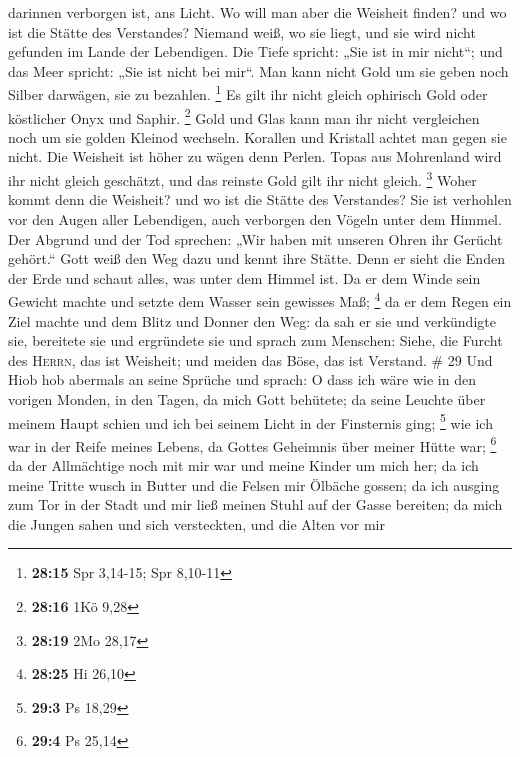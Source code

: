 darinnen verborgen ist, ans Licht.  Wo will man aber die
Weisheit finden? und wo ist die Stätte des Verstandes? 
Niemand weiß, wo sie liegt, und sie wird nicht gefunden im Lande der
Lebendigen.  Die Tiefe spricht: „Sie ist in mir nicht``;
und das Meer spricht: „Sie ist nicht bei mir``.  Man kann
nicht Gold um sie geben noch Silber darwägen, sie zu bezahlen.
\footnote{\textbf{28:15} Spr 3,14-15; Spr 8,10-11}  Es
gilt ihr nicht gleich ophirisch Gold oder köstlicher Onyx und Saphir.
\footnote{\textbf{28:16} 1Kö 9,28}  Gold und Glas kann
man ihr nicht vergleichen noch um sie golden Kleinod wechseln.
 Korallen und Kristall achtet man gegen sie nicht. Die
Weisheit ist höher zu wägen denn Perlen.  Topas aus
Mohrenland wird ihr nicht gleich geschätzt, und das reinste Gold gilt
ihr nicht gleich. \footnote{\textbf{28:19} 2Mo 28,17} 
Woher kommt denn die Weisheit? und wo ist die Stätte des Verstandes?
 Sie ist verhohlen vor den Augen aller Lebendigen, auch
verborgen den Vögeln unter dem Himmel.  Der Abgrund und
der Tod sprechen: „Wir haben mit unseren Ohren ihr Gerücht gehört.``
 Gott weiß den Weg dazu und kennt ihre Stätte.
 Denn er sieht die Enden der Erde und schaut alles, was
unter dem Himmel ist.  Da er dem Winde sein Gewicht
machte und setzte dem Wasser sein gewisses Maß; \footnote{\textbf{28:25}
  Hi 26,10}  da er dem Regen ein Ziel machte und dem
Blitz und Donner den Weg:  da sah er sie und verkündigte
sie, bereitete sie und ergründete sie  und sprach zum
Menschen: Siehe, die Furcht des \textsc{Herrn}, das ist Weisheit; und
meiden das Böse, das ist Verstand. \# 29  Und Hiob hob
abermals an seine Sprüche und sprach:  O dass ich wäre wie
in den vorigen Monden, in den Tagen, da mich Gott behütete;
 da seine Leuchte über meinem Haupt schien und ich bei
seinem Licht in der Finsternis ging; \footnote{\textbf{29:3} Ps 18,29}
 wie ich war in der Reife meines Lebens, da Gottes
Geheimnis über meiner Hütte war; \footnote{\textbf{29:4} Ps 25,14}
 da der Allmächtige noch mit mir war und meine Kinder um
mich her;  da ich meine Tritte wusch in Butter und die
Felsen mir Ölbäche gossen;  da ich ausging zum Tor in der
Stadt und mir ließ meinen Stuhl auf der Gasse bereiten; 
da mich die Jungen sahen und sich versteckten, und die Alten vor mir

